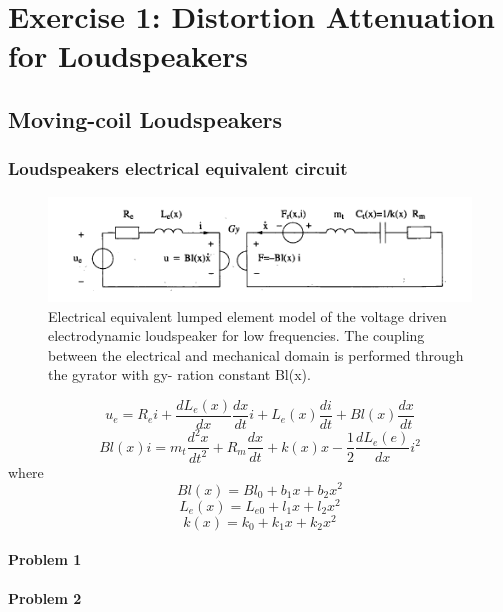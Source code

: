 \documentclass[11pt,a4paper,fleqn, onesside]{article}
\begin{document}
\pagebreak
{}
\setcounter{page}{1}
\setcounter{tocdepth}{4}
\setcounter{secnumdepth}{4} 
\tableofcontents
\newpage
{}


\part{Exercise 1: Distortion Attenuation for Loudspeakers}
\chapter{Moving-coil Loudspeakers}
\section{Loudspeakers electrical equivalent circuit}

\begin{figure}[H]
\includegraphics[scale=.6]{figures/circuit.png}
\caption{Electrical equivalent lumped element model of the voltage driven electrodynamic loudspeaker for low frequencies. The coupling between the
electrical and mechanical domain is performed through the gyrator with gy-
ration constant Bl(x).}
\label{circuit}
\end{figure}

\begin{equation} 
  \label{eq:1.1}    
  u_e=R_ei+\frac{dL_e(x)}{dx}\frac{dx}{dt}i+L_e(x)\frac{di}{dt}+Bl(x)\frac{dx}{dt}
\end{equation}
\begin{equation} 
  \label{eq:1.2}    
  Bl(x)i=m_t\frac{d^2x}{dt^2}+R_m\frac{dx}{dt}+k(x)x-\frac{1}{2}\frac{dL_e(e)}{dx}i^2
\end{equation}
where
\begin{equation} 
  \label{eq:1.3}    
  Bl(x)=Bl_0+b_1x+b_2x^2
\end{equation}
\begin{equation} 
  \label{eq:1.4}    
  L_e(x)=L_{e0}+l_1x+l_2x^2
\end{equation}
\begin{equation} 
  \label{eq:1.5}    
  k(x)=k_0+k_1x+k_2x^2
\end{equation}

\subsection{Problem 1}

\subsection{Problem 2}


  \begin{thebibliography}{2}

  \end{thebibliography}
\end{document}
